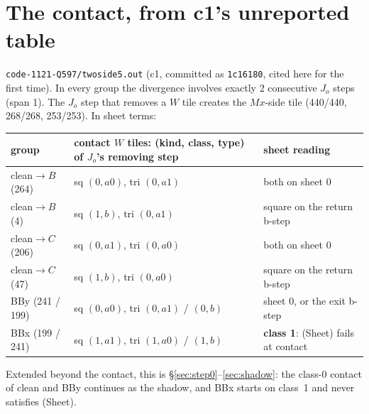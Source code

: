 \documentclass[11pt]{article}
\theoremstyle{definition}\newtheorem{definition}[theorem]{Definition}\newtheorem{remark}[theorem]{Remark}
\begin{document}
\section{The contact, from c1's unreported table}\label{sec:contact}
\texttt{code-1121-Q597/twoside5.out} (c1, committed as \texttt{1c16180}, cited here for the first time). In every group the divergence involves exactly 2 consecutive $J_o$ steps (span 1). The $J_o$ step that removes a $W$ tile creates the $Mx$-side tile (440/440, 268/268, 253/253).
In sheet terms:
\begin{center}\begin{tabular}{lll}\toprule
group & contact $W$ tiles: (kind, class, type) of $J_o$'s removing step & sheet reading\\\midrule
clean$\to B$ (264) & sq $(0,a0)$, tri $(0,a1)$ & both on sheet 0\\
clean$\to B$ (4) & sq $(1,b)$, tri $(0,a1)$ & square on the return b-step\\
clean$\to C$ (206) & sq $(0,a1)$, tri $(0,a0)$ & both on sheet 0\\
clean$\to C$ (47) & sq $(1,b)$, tri $(0,a0)$ & square on the return b-step\\
BBy (241 / 199) & sq $(0,a0)$, tri $(0,a1)$ / $(0,b)$ & sheet 0, or the exit b-step\\
BBx (199 / 241) & sq $(1,a1)$, tri $(1,a0)$ / $(1,b)$ & \textbf{class 1}: (Sheet) fails at contact\\\bottomrule
\end{tabular}\end{center}
Extended beyond the contact, this is \S\ref{sec:step0}--\ref{sec:shadow}: the class-0 contact of clean and BBy continues as the shadow, and BBx starts on class~1 and never satisfies (Sheet).
\end{document}
